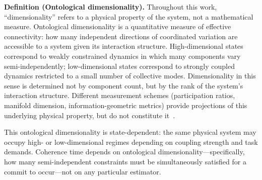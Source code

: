 \documentclass[12pt]{article}
\begin{document}
\noindent{}

\textbf{Definition (Ontological dimensionality).} Throughout this work, ``dimensionality'' refers to a physical property of the system, not a mathematical measure. Ontological dimensionality is a quantitative measure of effective connectivity: how many independent directions of coordinated variation are accessible to a system given its interaction structure. High-dimensional states correspond to weakly constrained dynamics in which many components vary semi-independently; low-dimensional states correspond to strongly coupled dynamics restricted to a small number of collective modes. Dimensionality in this sense is determined not by component count, but by the rank of the system's interaction structure. Different measurement schemes (participation ratios, manifold dimension, information-geometric metrics) provide projections of this underlying physical property, but do not constitute it~\cite{todd2025ig}.

This ontological dimensionality is state-dependent: the same physical system may occupy high- or low-dimensional regimes depending on coupling strength and task demands. Coherence time depends on ontological dimensionality---specifically, how many semi-independent constraints must be simultaneously satisfied for a commit to occur---not on any particular estimator.
\end{document}
